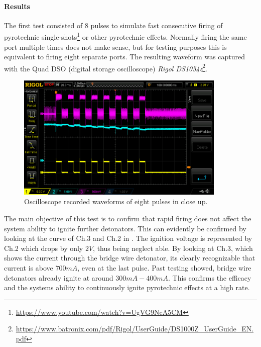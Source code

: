 \paragraph{Results}
\label{Results}

\noindent The first test consisted of 8 pulses to simulate fast consecutive firing of pyrotechnic single-shots\footnote{\url{https://www.youtube.com/watch?v=UgVG9NcA5CM}} or other pyrotechnic effects. Normally firing the same port multiple times does not make sense, but for testing purposes this is equivalent to firing eight separate ports. The resulting waveform was captured with the Quad DSO (digital storage oscilloscope) \textit{Rigol DS1054z}\footnote{\url{https://www.batronix.com/pdf/Rigol/UserGuide/DS1000Z_UserGuide_EN.pdf}}.\\

\begin{figure}[!ht]
    \centering
    \includegraphics[width=10cm]{./Figures/eight_pulses_close.png}
    \caption{Oscilloscope recorded waveforms of eight pulses in close up.}
    \label{fig:eight_pulses_close}     
\end{figure}
 
\noindent The main objective of this test is to confirm that rapid firing does not affect the system ability to ignite further detonators. This can evidently be confirmed by looking at the curve of Ch.3 and Ch.2 in . The ignition voltage is represented by Ch.2 which drops by only $2V$, thus being neglect able. By looking at Ch.3, which shows the current through the bridge wire detonator, its clearly recognizable that current is above $700mA$, even at the last pulse. Past testing showed, bridge wire detonators already ignite at around $300mA-400mA$. This confirms the efficacy and the systems ability to continuously ignite pyrotechnic effects at a high rate.

\pagebreak


